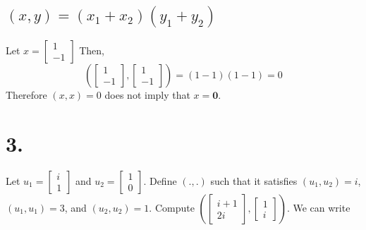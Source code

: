 \documentclass{article}
\begin{document}
\subsection{$(x,y) = (x_1 + x_2)(y_1  + y_2)$}
Let $x = \begin{bmatrix}1\\-1\end{bmatrix}$ Then,
\[ \left( \begin{bmatrix}1\\-1\end{bmatrix}, \begin{bmatrix}1\\-1\end{bmatrix}\right) = (1-1)(1-1) = 0\] Therefore $(x,x) = 0$ does not imply that $x = \mathbf{0}$.

\section*{3.}
Let $u_1 = \begin{bmatrix}i\\1\end{bmatrix}$ and  $u_2 = \begin{bmatrix}1\\0\end{bmatrix}$. Define $(.,.)$ such that it satisfies $(u_1,u_2) = i$,   $(u_1,u_1) = 3$,    and $(u_2, u_2) = 1$. Compute $\left (\begin{bmatrix}i + 1\\2i\end{bmatrix},\begin{bmatrix}1\\i\end{bmatrix}\right)$.
We can write
\end{document}
